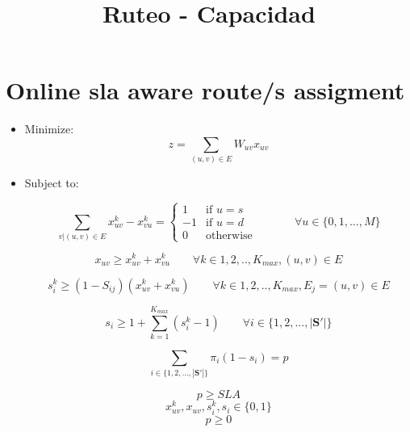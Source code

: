 \documentclass[12pt,a4paper,spanish]{report}
\title{Ruteo - Capacidad}
\begin{document}
\section{Online sla aware route/s assigment}
			\begin{itemize}
				\item Minimize:
					$$  z =  \sum_{(u,v) \in E}{ W_{uv} x_{uv}} $$
					
				\item Subject to:
				
					\[ \sum_{v | (u,v) \in E }{x^k_{uv} - x^k_{vu}} =
					\left\{ \begin{array}{ll}
 					1 & \mbox{if } u = s \\
 					-1 & \mbox{if } u = d \\
 					0 & \mbox{otherwise } 
					\end{array} \right. \quad \quad  \quad  \forall u \in \{0,1,... ,M\} \]
					
                    $$ x_{uv} \geq x^k_{uv} + x^k_{vu} \quad \quad \forall k \in 1,2,..,K_{max}, (u,v) \in E$$					
					
					$$ s^k_i \geq (1- S_{ij})(x^k_{uv} + x^k_{vu}) \quad \quad \forall k \in 1,2,..,K_{max}, E_j = (u,v) \in E$$
					
					$$ s_i \geq 1 + \sum_{k=1}^{K_{max}}{(s^k_i-1)}   \quad \quad \forall i \in \{1,2,...,|\mathbf{S'}|\} $$
					
					$$ \sum_{i \in \{1,2,...,|\mathbf{S'}|\} }\pi_i (1 - s_i) = p $$
					
					$$ p \geq SLA $$
					\bigskip
					$$ x^k_{uv},x_{uv}, s_i^k, s_i \in \{0,1\} $$
					$$ p \geq 0 $$
					

		\end{itemize}
\end{document}
